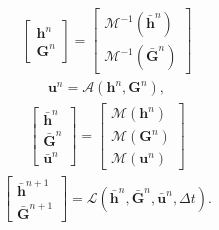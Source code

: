 \documentclass[SingleSpace,12pt]{Serre_ASCE}
\begin{document}
\begin{linenomath*}
\begin{gather*}
\left[\begin{array}{c}
 \boldsymbol{h}^{n} \\
 \boldsymbol{G}^{n}
  \end{array}\right] = \left[\begin{array}{c}
   \mathcal{M}^{-1}\left(\boldsymbol{\bar{h}}^{n}\right) \\
   \mathcal{M}^{-1}\left(\boldsymbol{\bar{G}}^{n}\right)
    \end{array}\right]
\end{gather*}
\begin{gather*}
\boldsymbol{u}^n = \mathcal{A}(\boldsymbol{h}^n,\boldsymbol{G}^n),
\end{gather*}
\begin{gather*}
\left[\begin{array}{c}
 \boldsymbol{\bar{h}}^{n} \\
 \boldsymbol{\bar{G}}^{n}\\
 \boldsymbol{\bar{u}}^{n}
  \end{array}\right] = \left[\begin{array}{c}
   \mathcal{M}\left(\boldsymbol{h}^{n}\right) \\
   \mathcal{M}\left(\boldsymbol{G}^{n}\right)\\
   \mathcal{M}\left(\boldsymbol{u}^{n}\right)
    \end{array}\right]
\end{gather*}
\begin{gather*}
\left[\begin{array}{c}
 \boldsymbol{\bar{h}}^{n+1} \\
 \boldsymbol{\bar{G}}^{n+1} \end{array}\right] = \mathcal{L}(\boldsymbol{\bar{h}}^{n},\boldsymbol{\bar{G}}^{n},\boldsymbol{\bar{u}}^{n},\Delta t).
\end{gather*}
\end{linenomath*}
\end{document}
